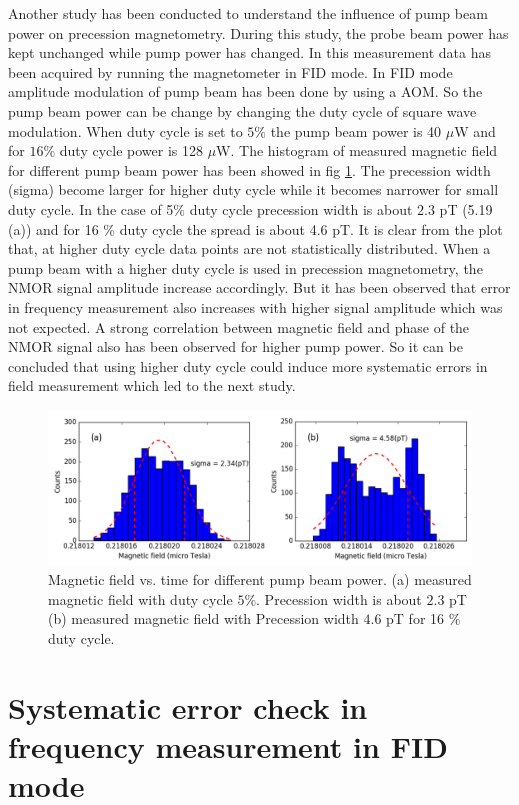 Another study has been conducted to understand the influence of pump beam power on precession magnetometry. During this study, the probe beam power has kept unchanged while pump power has changed. In this measurement data has been acquired by running the magnetometer in FID mode. In FID mode amplitude modulation of pump beam has been done by using a AOM.  So the pump beam power can be change by changing the duty cycle of square wave modulation. When duty cycle is set to $5\%$ the pump beam power is 40 $\mu$W and for $16 \%$ duty cycle power is 128 $\mu$W. The histogram of measured magnetic field for different pump beam power has been showed in fig \ref{fig:different pump power}. The precession width (sigma) become larger for higher duty cycle while it becomes narrower for small duty cycle. In the case of 5$\%$  duty cycle precession width is about $2.3$ pT  (5.19 (a)) and for 16 $\%$ duty cycle the spread is about 4.6 pT. It is clear from the plot that, at higher duty cycle data points are not statistically distributed.  When a pump beam with a higher duty cycle is used  in precession magnetometry, the NMOR  signal amplitude increase accordingly. But it has been observed that error in frequency measurement also increases with higher signal amplitude which was not expected. A strong correlation between magnetic field and phase of the NMOR signal also has been observed for higher pump power. So it can be concluded that using higher duty cycle could induce more systematic errors in field measurement which led to the next study.
 \begin{figure}
    \centering  \includegraphics[width=\textwidth]{figures/pump_beam}
    \caption{ Magnetic field vs. time for different pump beam power. (a) measured magnetic field with duty cycle $5 \%$. Precession width is about $2.3$ pT (b) measured magnetic field with Precession width $4.6$ pT for  16 $\%$ duty cycle.}
    \label{fig:different pump power}
\end{figure}

\section{Systematic error check in frequency measurement in FID mode} 
